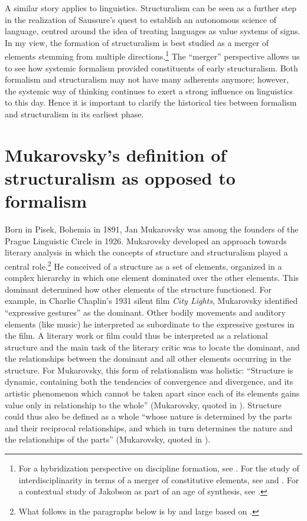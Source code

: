 \documentclass[output=paper]{langscibook}
\begin{document}
A similar story applies to linguistics.  Structuralism can be seen as a further step in the realization of Saussure's quest to establish an autonomous science of language, centred around the idea of treating languages as value systems of signs. In my view, the formation of structuralism is best studied as a merger of elements stemming from multiple directions.\footnote{For a hybridization perspective on discipline formation, see \citet{Karstens2012}. For the study of interdisciplinarity in terms of a merger of constitutive elements, see \citet{Graff2015} and \citet{Bod2019}. For a contextual study of Jakobson as part of an age of synthesis, see \citet{Karstens2017lonely}.} The ``merger'' perspective allows us to see how systemic formalism provided constituents of early structuralism. Both formalism and structuralism may not have many adherents anymore; however, the systemic way of thinking continues to exert a strong influence on linguistics to this day. Hence it is important to clarify the historical ties between formalism and structuralism in its earliest phase.

\section{Mukarovsky's definition of structuralism as opposed to formalism}
\label{sec:karstens:mukarovsky}

Born in Pisek, Bohemia in 1891, Jan Mukarovsky was among the founders of the Prague Linguistic Circle in 1926. Mukarovsky developed an approach towards literary analysis in which the concepts of structure and structuralism played a central role.\footnote{What follows in the paragraphs below is by and large based on \citet[22--44]{Galan1985}.} He conceived of a structure as a set of elements, organized in a complex hierarchy in which one element dominated over the other elements. This dominant determined how other elements of the structure functioned. For example, in Charlie Chaplin's 1931 silent film \emph{City Lights}, Mukarovsky identified ``expressive gestures'' as the dominant. Other bodily movements and auditory elements (like music) he interpreted as subordinate to the expressive gestures in the film. A literary work or film could thus be interpreted as a relational structure and the main task of the literary critic was to locate the dominant, and the relationships between the dominant and all other elements occurring in the structure. For Mukarovsky, this form of relationalism was holistic: ``Structure is dynamic, containing both the tendencies of convergence and divergence, and its artistic phenomenon which cannot be taken apart since each of its elements gains value only in relationship to the whole'' (Mukarovsky, quoted in \citealt[30]{Galan1985}). Structure could thus also be defined as a whole ``whose nature is determined by the parts and their reciprocal relationships, and which in turn determines the nature and the relationships of the parts'' (Mukarovsky, quoted in \citealt[35]{Galan1985}).
\end{document}
